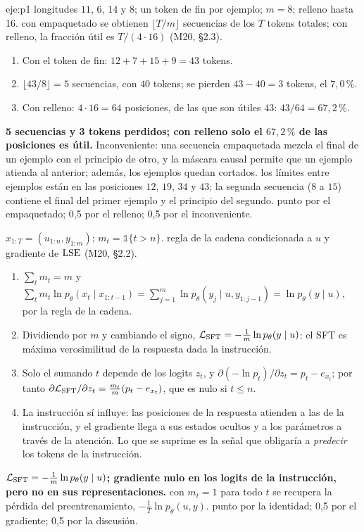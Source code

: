 \begin{solucion}{eje:p1}
\datos longitudes $11$, $6$, $14$ y $8$; un token de fin por ejemplo; $m=8$; relleno hasta 16.
\planteamiento con empaquetado se obtienen $\lfloor T/m\rfloor$ secuencias de los $T$ tokens totales; con relleno, la fracción útil es $T/(4\cdot 16)$ (M20, §2.3).
\pasos
\begin{enumerate}[label=\arabic*.]
  \item Con el token de fin: $12+7+15+9=43$ tokens.
  \item $\lfloor 43/8\rfloor=5$ secuencias, con $40$ tokens; se pierden $43-40=3$ tokens, el $7{,}0\,\%$.
  \item Con relleno: $4\cdot 16=64$ posiciones, de las que son útiles $43$: $43/64=67{,}2\,\%$.
\end{enumerate}
\resultado \textbf{5 secuencias y 3 tokens perdidos; con relleno solo el $67{,}2\,\%$ de las posiciones es útil.} Inconveniente: una secuencia empaquetada mezcla el final de un ejemplo con el principio de otro, y la máscara causal permite que un ejemplo atienda al anterior; además, los ejemplos quedan cortados.
\comprobacion los límites entre ejemplos están en las posiciones $12$, $19$, $34$ y $43$; la segunda secuencia ($8$ a $15$) contiene el final del primer ejemplo y el principio del segundo.
 punto por el empaquetado; 0,5 por el relleno; 0,5 por el inconveniente.

\datos $x_{1:T}=(u_{1:n},y_{1:m})$; $m_t=\mathbb{1}\{t>n\}$.
\planteamiento regla de la cadena condicionada a $u$ y gradiente de $\operatorname{LSE}$ (M20, §2.2).
\pasos
\begin{enumerate}[label=\arabic*.]
  \item $\sum_tm_t=m$ y $\sum_tm_t\ln p_\theta(x_t\mid x_{1:t-1})=\sum_{j=1}^{m}\ln p_\theta(y_j\mid u,y_{1:j-1})=\ln p_\theta(y\mid u)$, por la regla de la cadena.
  \item Dividiendo por $m$ y cambiando el signo, $\mathcal{L}_{\mathrm{SFT}}=-\frac1m\ln p_\theta(y\mid u)$: el SFT es máxima verosimilitud de la respuesta dada la instrucción.
  \item Solo el sumando $t$ depende de los logits $z_t$, y $\partial(-\ln p_t)/\partial z_t=p_t-e_{x_t}$; por tanto $\partial\mathcal{L}_{\mathrm{SFT}}/\partial z_t=\frac{m_t}{m}(p_t-e_{x_t})$, que es nulo si $t\le n$.
  \item La instrucción sí influye: las posiciones de la respuesta atienden a las de la instrucción, y el gradiente llega a sus estados ocultos y a los parámetros a través de la atención. Lo que se suprime es la señal que obligaría a \emph{predecir} los tokens de la instrucción.
\end{enumerate}
\resultado \textbf{$\mathcal{L}_{\mathrm{SFT}}=-\frac1m\ln p_\theta(y\mid u)$; gradiente nulo en los logits de la instrucción, pero no en sus representaciones.}
\comprobacion con $m_t=1$ para todo $t$ se recupera la pérdida del preentrenamiento, $-\frac1T\ln p_\theta(u,y)$.
 punto por la identidad; 0,5 por el gradiente; 0,5 por la discusión.
\end{solucion}


